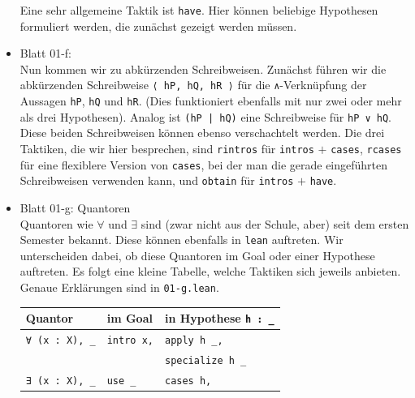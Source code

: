 \documentclass[11pt]{article}
\newcommand{\leanin}{\texttt}
\newcommand{\leanstate}{\texttt}
\begin{document}
\begin{itemize}
  Eine sehr allgemeine Taktik ist \leanin{have}. Hier können beliebige Hypothesen formuliert werden, die zunächst gezeigt werden müssen.
\item Blatt 01-f: \\
  Nun kommen wir zu abkürzenden Schreibweisen. Zunächst führen wir die abkürzenden Schreibweise \leanstate{⟨ hP, hQ, hR ⟩} für die \leanstate{∧}-Verknüpfung  der Aussagen \leanstate{hP}, \leanstate{hQ} und \leanstate{hR}. (Dies funktioniert ebenfalls mit nur zwei oder mehr als drei Hypothesen). Analog ist \leanstate{(hP | hQ)} eine Schreibweise für \leanstate{hP ∨ hQ}. Diese beiden Schreibweisen können ebenso verschachtelt werden. Die drei Taktiken, die wir hier besprechen, sind \leanin{rintros} für \leanin{intros} $+$ \leanin{cases}, \leanin{rcases} für eine flexiblere Version von \leanin{cases}, bei der man die gerade eingeführten Schreibweisen verwenden kann, und \leanin{obtain} für \leanin{intros} $+$ \leanin{have}.
\item Blatt 01-g: Quantoren\\
  Quantoren wie $\forall$ und $\exists$ sind (zwar nicht aus der Schule, aber) seit dem ersten Semester bekannt. Diese können ebenfalls in \leanstate{lean} auftreten. Wir unterscheiden dabei, ob diese Quantoren im Goal oder einer Hypothese auftreten. Es folgt eine kleine Tabelle, welche Taktiken sich jeweils anbieten. Genaue Erklärungen sind in \leanstate{01-g.lean}.

  \begin{center}
    \begin{tabular}{|l||l|l|} \hline
      \vphantom{$\int$} Quantor & im Goal & in Hypothese \leanstate{h : _} \\\hline\hline
      \vphantom{$\int$} \leanstate{∀ (x : X), _} & \leanin{intro x,} & \leanin{apply h _,} \\ && \leanin{specialize h _} \\\hline
      \vphantom{$\int$} \leanstate{∃ (x : X), _} & \leanin{use _} & \leanin{cases h,} \\ \hline
    \end{tabular}
  \end{center}



\end{itemize}
\end{document}
